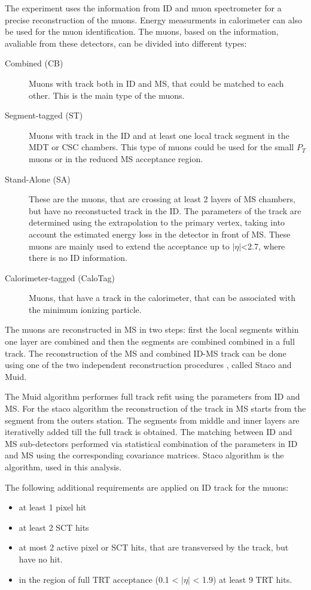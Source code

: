 The \atlas experiment uses the information from ID and muon spectrometer  for a precise reconstruction of the muons. Energy measurments in calorimeter can also be used for the muon identification. The muons, based on the information, avaliable from these detectors, can be divided into different types:
\begin{description}
\item[Combined (CB)] Muons with track both in ID and MS, that could be matched to each other. This is the main type of the muons.
\item[Segment-tagged (ST)] Muons with track in the ID and at least one local track segment in the MDT or CSC chambers. This type of muons could be used for the small $P_{T}$ muons or in the reduced MS acceptance region.
\item[Stand-Alone (SA)] These are the muons, that are crossing at least 2 layers of MS chambers, but have no reconstucted track in the ID. The parameters of the track are determined using the extrapolation to the primary vertex, taking into account the estimated energy loss in the detector in front of MS. These muons are mainly used to extend the acceptance up to $|\eta|$<2.7, where there is no ID information.
\item[Calorimeter-tagged (CaloTag)]  Muons, that have a track in the calorimeter, that can be associated with the minimum ionizing particle.
\end{description}

The muons are reconstructed in MS in two steps: first the local segments within one layer are combined and then the segments are combined combined in a full track. The reconstruction of the MS and combined ID-MS track can be done using one of the two independent reconstruction procedures \cite{AtlasPerf}, called Staco and Muid.  

The Muid algorithm performes full track refit using the parameters from ID and MS\cite{Muid}. 
For the staco algorithm the reconstruction of the track in MS starts from the segment from the outers station. The segments from middle and  inner layers are iterativelly added till the full track is obtained. The matching between ID and MS sub-detectors performed via statistical combination of the parameters in ID and MS using the corresponding covariance matrices\cite{Staco}. Staco algorithm is the algorithm, used in this analysis. 

The following additional requirements are applied on ID track for the muons:
\begin{itemize}
\item  at least 1 pixel hit
\item at least 2 SCT hits
\item at most 2 active pixel or SCT hits, that are transversed by the track, but have no hit.
\item in the region of full TRT acceptance (0.1 < $|\eta|$ < 1.9) at least 9 TRT hits.
\end{itemize}


